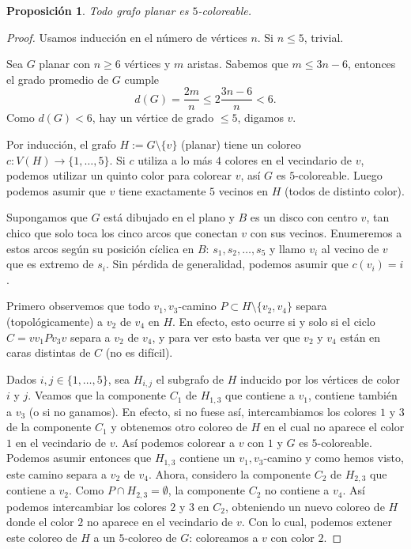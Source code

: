 \documentclass[12pt]{report}
\theoremstyle{plain}
\newtheorem{proposition}[theorem]{Proposición}
\theoremstyle{definition}
\begin{document}
\begin{proposition}
Todo grafo planar es $5$-coloreable.
\end{proposition}
\begin{proof}
Usamos inducción en el número de vértices $n$. Si $n \leq 5$, trivial.

Sea $G$ planar con $n \geq 6$ vértices y $m$ aristas. Sabemos que $m \leq 3n -6$, entonces el grado promedio de $G$ cumple
\[
    d(G) = \frac{2 m}{n} \leq 2 \frac{3n - 6}{n} < 6.
\]
Como $d(G) < 6$, hay un vértice de grado $\leq 5$, digamos $v$.

Por inducción, el grafo $H := G \setminus \{v\}$ (planar) tiene un coloreo $c : V(H) \rightarrow \{1, \ldots, 5\}$. Si $c$ utiliza a lo más $4$ colores en el vecindario de $v$, podemos utilizar un quinto color para colorear $v$, así $G$ es $5$-coloreable. Luego podemos asumir que $v$ tiene exactamente $5$ vecinos en $H$ (todos de distinto color).

Supongamos que $G$ está dibujado en el plano y $B$ es un disco con centro $v$, tan chico que solo toca los cinco arcos que conectan $v$ con sus vecinos. Enumeremos a estos arcos según su posición cíclica en $B$: $s_1, s_2, \ldots, s_5$ y llamo $v_i$ al vecino de $v$ que es extremo de $s_i$. Sin pérdida de generalidad, podemos asumir que $c(v_i) = i$.

Primero observemos que todo $v_1,v_3$-camino $P \subset H \setminus \{v_2, v_4\}$ separa (topológicamente) a $v_2$ de $v_4$ en $H$. En efecto, esto ocurre si y solo si el ciclo $C = v v_1 P v_3 v$ separa a $v_2$ de $v_4$, y para ver esto basta ver que $v_2$ y $v_4$ están en caras distintas de $C$ (no es difícil).


Dados $i,j \in \{1, \ldots, 5\}$, sea $H_{i,j}$ el subgrafo de $H$ inducido por los vértices de color $i$ y $j$. Veamos que la componente $C_1$ de $H_{1,3}$ que contiene a $v_1$, contiene también a $v_3$ (o si no ganamos). En efecto, si no fuese así, intercambiamos los colores $1$ y $3$ de la componente $C_1$ y obtenemos otro coloreo de $H$ en el cual no aparece el color $1$ en el vecindario de $v$. Así podemos colorear a $v$ con $1$ y $G$ es $5$-coloreable. Podemos asumir entonces que $H_{1,3}$ contiene un $v_1, v_3$-camino y como hemos visto, este camino separa a $v_2$ de $v_4$. Ahora, considero la componente $C_2$ de $H_{2,3}$ que contiene a $v_2$. Como $P \cap H_{2,3} = \emptyset$, la componente $C_2 $ no contiene a $v_4$. Así podemos intercambiar los colores $2$ y $3$ en $C_2$, obteniendo un nuevo coloreo de $H$ donde el color $2$ no aparece en el vecindario de $v$. Con lo cual, podemos extener este coloreo de $H$ a un $5$-coloreo de $G$: coloreamos a $v$ con color $2$.
\end{proof}
\end{document}
